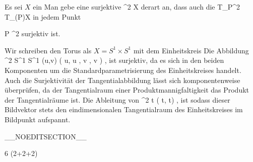 {

Es sei $X$ ein
Man gebe eine surjektive
\maabbdisp {\varphi} {\R^2} {X
} {}
derart an, dass auch die
 { T_P\R^2 } { T_{\varphi(P)}X
} {}
in jedem Punkt

\mavergleichskette
{\vergleichskette
{ P
}
{ \in }{ \R^2
}
{  }{
}
{    }{
}
{   }{
}
}
{}{}{}
surjektiv ist.

}
{

Wir schreiben den Torus als $X=S^1 \times S^1$ mit dem Einheitskreis
Die Abbildung
\maabbeledisp {\varphi} {\R^2} {S^1 \times S^1
} {(u,v)} {( \cos  u, \sin  u , \cos  v , \sin  v )
} {,}
ist surjektiv, da es sich in den beiden Komponenten um die Standardparametrisierung des Einheitskreises handelt. Auch die Surjektivität der Tangentialabbildung lässt sich komponentenweise überprüfen, da der Tangentialraum einer Produktmannigfaltigkeit das Produkt der Tangentialräume ist. Die Ableitung von
\maabbeledisp {} {\R} { \R^2
} { t } { ( \cos  t, \sin  t)
} {,}
ist
 sodass dieser Bildvektor stets den eindimensionalen Tangentialraum des Einheitskreises im Bildpunkt aufspannt.

 }

__NOEDITSECTION__

{6 (2+2+2)}

